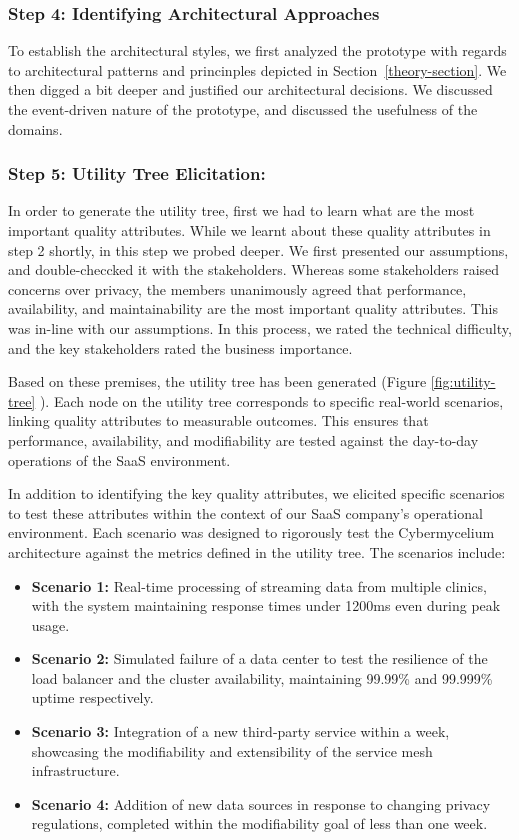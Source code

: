 \documentclass[review]{elsarticle}
\begin{document}
\subsubsection{Step 4: Identifying Architectural Approaches}

To establish the architectural styles, we first analyzed the prototype with regards to architectural patterns and princinples depicted in Section~\ref*{theory-section}. We then digged a bit deeper and justified our architectural decisions. We discussed the event-driven nature of the prototype, and discussed the usefulness of the domains.

\subsubsection{Step 5: Utility Tree Elicitation:}
In order to generate the utility tree, first we had to learn what are the most important quality attributes. While we learnt about these quality attributes in step 2 shortly, in this step we probed deeper. We first presented our assumptions, and double-checcked it with the stakeholders. Whereas some stakeholders raised concerns over privacy, the members unanimously agreed that performance, availability, and maintainability are the most important quality attributes. This was in-line with our assumptions. In this process, we rated the technical difficulty, and the key stakeholders rated the business importance.

Based on these premises, the utility tree has been generated (Figure \ref{fig:utility-tree} ). Each node on the utility tree corresponds to specific real-world scenarios, linking quality attributes to measurable outcomes. This ensures that performance, availability, and modifiability are tested against the day-to-day operations of the SaaS environment.

In addition to identifying the key quality attributes, we elicited specific scenarios to test these attributes within the context of our SaaS company's operational environment. Each scenario was designed to rigorously test the Cybermycelium architecture against the metrics defined in the utility tree. The scenarios include:

\begin{itemize}
    \item \textbf{Scenario 1:} Real-time processing of streaming data from multiple clinics, with the system maintaining response times under 1200ms even during peak usage.
    \item \textbf{Scenario 2:} Simulated failure of a data center to test the resilience of the load balancer and the cluster availability, maintaining 99.99\% and 99.999\% uptime respectively.
    \item \textbf{Scenario 3:} Integration of a new third-party service within a week, showcasing the modifiability and extensibility of the service mesh infrastructure.
    \item \textbf{Scenario 4:} Addition of new data sources in response to changing privacy regulations, completed within the modifiability goal of less than one week.
\end{itemize}
\end{document}
